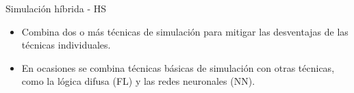 \begin{frame}{Simulación híbrida - HS}
    \begin{itemize}
        \item Combina dos o más técnicas de simulación para mitigar las desventajas de las técnicas individuales.
        \item En ocasiones se combina técnicas básicas de simulación con otras técnicas, como la lógica difusa (FL) y las redes neuronales (NN).
    \end{itemize}
\end{frame}